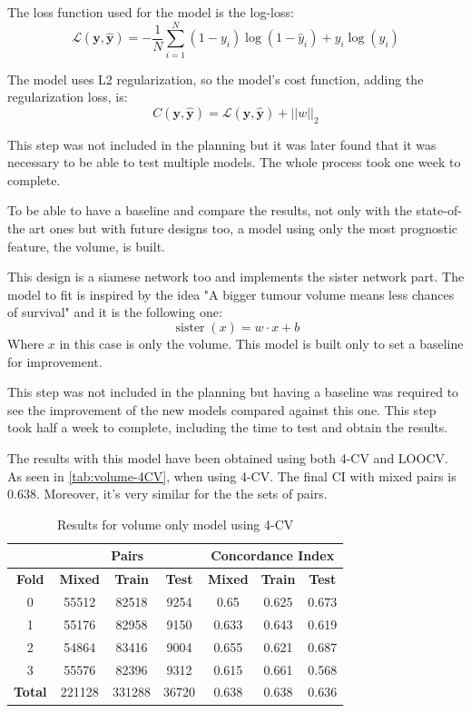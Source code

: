 The loss function used for the model is the log-loss:
\[
  \mathcal{L}(\bm{y}, \hat{\bm{y}}) = -\frac{1}{N} \sum_{i = 1}^{N}
  (1 - y_i)\log(1 - \hat{y}_i) + y_i\log(\hat{y}_i)
\]

The model uses L2 regularization, so the model's cost function, 
adding the regularization loss, is:
\[
  C(\bm{y}, \hat{\bm{y}}) = \mathcal{L}(\bm{y}, \hat{\bm{y}}) + 
  ||w||_2
\]

This step was not included in the planning but it was later found that it was necessary to be 
able to test multiple models. The whole process took one week to complete.


To be able to have a baseline and compare the results, not only with the state-of-the art ones
but with future designs too, a model using only the most prognostic feature, the volume, is 
built.

This design is a siamese network too and implements the sister network part. The model to fit
is inspired by the idea "A bigger tumour volume means less chances of 
survival" and it is the following one:
\[
  \operatorname{sister}(x) = w\cdot x + b
\]
Where \( x \) in this case is only the volume. This model is built only to set a 
baseline for improvement.

This step was not included in the planning but having a baseline was required to see the 
improvement of the new models compared against this one. This step took half a week to complete,
including the time to test and obtain the results.


The results with this model have been obtained using both 4-CV and \gls{LOOCV}.
As seen in \autoref{tab:volume-4CV}, when using 4-CV. The final \gls{CI} with mixed pairs
is 0.638. Moreover, it's very similar for the the sets of pairs.

\begin{table}
  \centering
  \begin{tabular}{|c||c|c|c||c|c|c|}
    \cline{2-7}
    \multicolumn{1}{c|}{} & \multicolumn{3}{|c||}{\textbf{Pairs}} & 
    \multicolumn{3}{c|}{\textbf{Concordance Index}} \\
    \hline
    \textbf{Fold} & \textbf{Mixed} & \textbf{Train} & \textbf{Test} 
    & \textbf{Mixed} & \textbf{Train} & \textbf{Test} \\
    \hhline{=======}
    0 & 55512 & 82518 & 9254 & 0.65 & 0.625 & 0.673 \\
    1 & 55176 & 82958 & 9150 & 0.633 & 0.643 & 0.619 \\
    2 & 54864 & 83416 & 9004 & 0.655 & 0.621 & 0.687 \\
    3 & 55576 & 82396 & 9312 & 0.615 & 0.661 & 0.568 \\
    \hhline{=======}
    \textbf{Total} & 221128 & 331288 & 36720 & 0.638 & 0.638 & 0.636 \\
    \hline
  \end{tabular}

  \caption{Results for volume only model using 4-CV \label{tab:volume-4CV}}
\end{table}

